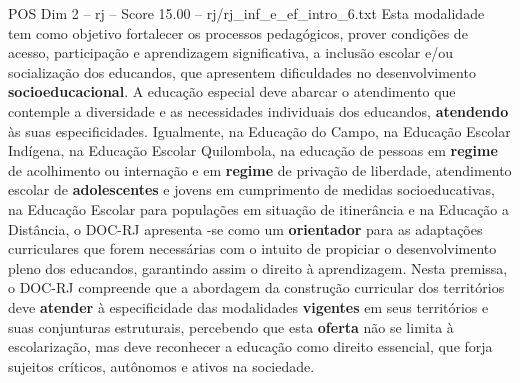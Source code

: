 \begin{textsample}{POS Dim 2 – rj – Score 15.00 – rj/rj\_inf\_e\_ef\_intro\_6.txt}
Esta modalidade tem como objetivo fortalecer os processos pedagógicos, prover condições de acesso, participação e aprendizagem significativa, a inclusão escolar e/ou socialização dos educandos, que apresentem dificuldades no desenvolvimento \textbf{socioeducacional}.
A educação especial deve abarcar o atendimento que contemple a diversidade e as necessidades individuais dos educandos, \textbf{atendendo} às suas especificidades.
Igualmente, na Educação do Campo, na Educação Escolar Indígena, na Educação Escolar Quilombola, na educação de pessoas em \textbf{regime} de acolhimento ou internação e em \textbf{regime} de privação de liberdade, atendimento escolar de \textbf{adolescentes} e jovens em cumprimento de medidas socioeducativas, na Educação Escolar para populações em situação de itinerância e na Educação a Distância, o DOC-RJ apresenta -se como um \textbf{orientador} para as adaptações curriculares que forem necessárias com o intuito de propiciar o desenvolvimento pleno dos educandos, garantindo assim o direito à aprendizagem.
Nesta premissa, o DOC-RJ compreende que a abordagem da construção curricular dos territórios deve \textbf{atender} à especificidade das modalidades \textbf{vigentes} em seus territórios e suas conjunturas estruturais, percebendo que esta \textbf{oferta} não se limita à escolarização, mas deve reconhecer a educação como direito essencial, que forja sujeitos críticos, autônomos e ativos na sociedade.

\end{textsample}
